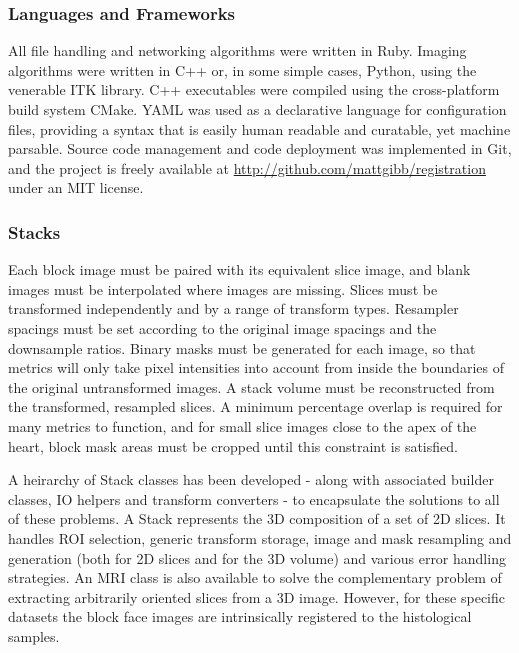 		\subsubsection{Languages and Frameworks} %
		\label{ssub:languages_and_frameworks}
      All file handling and networking algorithms were written in Ruby. Imaging algorithms were written in C++ or, in some simple cases, Python, using the venerable ITK library. C++ executables were compiled using the cross-platform build system CMake. YAML was used as a declarative language for configuration files, providing a syntax that is easily human readable and curatable, yet machine parsable. Source code management and code deployment was implemented in Git, and the project is freely available at \url{http://github.com/mattgibb/registration} under an MIT license.
		
    \subsubsection{Stacks} %
    \label{ssub:stacks}
      Each block image must be paired with its equivalent slice image, and blank images must be interpolated where images are missing. Slices must be transformed independently and by a range of transform types. Resampler spacings must be set according to the original image spacings and the downsample ratios. Binary masks must be generated for each image, so that metrics will only take pixel intensities into account from inside the boundaries of the original untransformed images. A stack volume must be reconstructed from the transformed, resampled slices. A minimum percentage overlap is required for many metrics to function, and for small slice images close to the apex of the heart, block mask areas must be cropped until this constraint is satisfied.
	  	
      A heirarchy of Stack classes has been developed - along with associated builder classes, IO helpers and transform converters - to encapsulate the solutions to all of these problems. A Stack represents the 3D composition of a set of 2D slices. It handles ROI selection, generic transform storage, image and mask resampling and generation (both for 2D slices and for the 3D volume) and various error handling strategies. An MRI class is also available to solve the complementary problem of extracting arbitrarily oriented slices from a 3D image. However, for these specific datasets the block face images are intrinsically registered to the histological samples.
    
